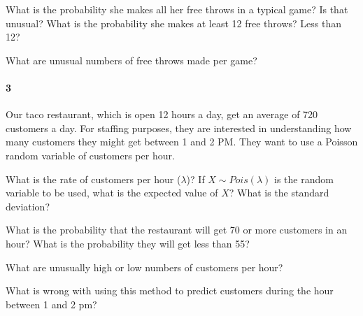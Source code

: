 \documentclass{article}
\begin{document}
\begin{flushleft}
\begin{enumalpha}
\vspace{1.8in}
\item What is the probability she makes all her free throws in a typical game? Is that unusual? What is the probability she makes at least 12 free throws? Less than 12?

\vspace{1.8in}
\item What are unusual numbers of free throws made per game?
\end{enumalpha}

\newpage
\paragraph{3} Our taco restaurant, which is open 12 hours a day, get an average of 720 customers a day. For staffing purposes, they are interested in understanding how many customers they might get between 1 and 2 PM. They want to use a Poisson random variable of customers per hour.
\begin{enumalpha}
\item What is the rate of customers per hour ($\lambda$)? If $X \sim Pois(\lambda)$ is the random variable to be used, what is the expected value of $X$? What is the standard deviation?

\vspace{1.8in}
\item What is the probability that the restaurant will get 70 or more customers in an hour? What is the probability they will get less than 55? 

\vspace{1.8in}
\item What are unusually high or low numbers of customers per hour?

\vspace{1.8in}
\item What is wrong with using this method to predict customers during the hour between 1 and 2 pm?
\end{enumalpha}



\end{flushleft}
\end{document}

